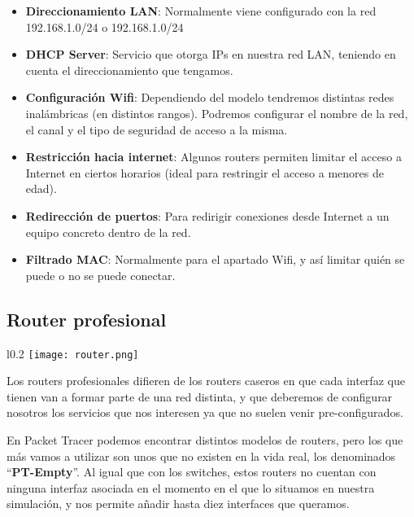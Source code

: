 \begin{itemize}
    \item \textbf{Direccionamiento LAN}: Normalmente viene configurado con la red 192.168.1.0/24 o 192.168.1.0/24

    \item \textbf{DHCP Server}: Servicio que otorga IPs en nuestra red LAN, teniendo en cuenta el direccionamiento que tengamos.

    \item \textbf{Configuración Wifi}: Dependiendo del modelo tendremos distintas redes inalámbricas (en distintos rangos). Podremos configurar el nombre de la red, el canal y el tipo de seguridad de acceso a la misma.

    \item \textbf{Restricción hacia internet}: Algunos routers permiten limitar el acceso a Internet en ciertos horarios (ideal para restringir el acceso a menores de edad).

    \item \textbf{Redirección de puertos}: Para redirigir conexiones desde Internet a un equipo concreto dentro de la red.

    \item \textbf{Filtrado MAC}: Normalmente para el apartado Wifi, y así limitar quién se puede o no se puede conectar.
\end{itemize}


\subsection{Router profesional}
\begin{wrapfigure}{l}{0.2\linewidth}
    \centering
    \vspace{-20pt}
    \texttt{[image: router.png]}
    \vspace{-32pt}
\end{wrapfigure}

Los routers profesionales difieren de los routers caseros en que cada interfaz que tienen van a formar parte de una red distinta, y que deberemos de configurar nosotros los servicios que nos interesen ya que no suelen venir pre-configurados.

En Packet Tracer podemos encontrar distintos modelos de routers, pero los que más vamos a utilizar son unos que no existen en la vida real, los denominados “\textbf{PT-Empty}”. Al igual que con los switches, estos routers no cuentan con ninguna interfaz asociada en el momento en el que lo situamos en nuestra simulación, y nos permite añadir hasta diez interfaces que queramos.

